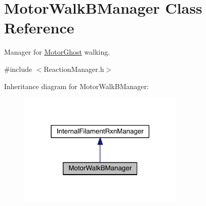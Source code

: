 \hypertarget{classMotorWalkBManager}{\section{Motor\+Walk\+B\+Manager Class Reference}
\label{classMotorWalkBManager}
}


Manager for \hyperlink{classMotorGhost}{Motor\+Ghost} walking.  




{\ttfamily \#include $<$Reaction\+Manager.\+h$>$}



Inheritance diagram for Motor\+Walk\+B\+Manager\+:
\nopagebreak
\begin{figure}[H]
\begin{center}
\leavevmode
\includegraphics[width=225pt]{classMotorWalkBManager__inherit__graph}
\end{center}
\end{figure}


